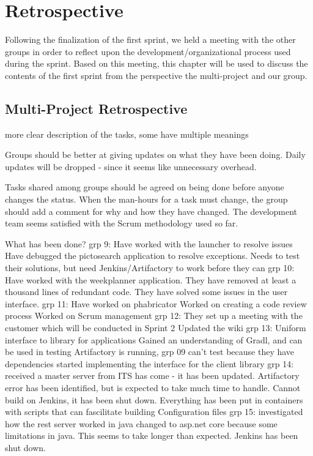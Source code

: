 \section{Retrospective}
Following the finalization of the first sprint, we held a meeting with the other
groups in order to reflect upon the development/organizational process used
during the sprint. Based on this meeting, this chapter will be used to discuss
the contents of the first sprint from the perspective the multi-project and our
group.

\subsection{Multi-Project Retrospective}

more clear description of the tasks, some have multiple meanings

Groups should be better at giving updates on what they have been doing.
Daily updates will be dropped - since it seems like unnecessary overhead.

Tasks shared among groups should be agreed on being done before anyone changes the status.
When the man-hours for a task must change, the group should add a comment for why and how they have changed.
The development team seems satisfied with the Scrum methodology used so far.

What has been done?
grp 9:
Have worked with the launcher to resolve issues
Have debugged the pictosearch application to resolve exceptions.
Needs to test their solutions, but need Jenkins/Artifactory to work before they can
grp 10:
Have worked with the weekplanner application.
They have removed at least a thousand lines of redundant code.
They have solved some issues in the user interface.
grp 11:
Have worked on phabricator
Worked on creating a code review process
Worked on Scrum management
grp 12:
They set up a meeting with the customer which will be conducted in Sprint 2
Updated the wiki
grp 13:
Uniform interface to library for applications
Gained an understanding of Gradl, and can be used in testing
Artifactory is running, grp 09 can’t test because they have dependencies
started implementing the interface for the client library
grp 14:
received a master server from ITS has come - it has been updated.
Artifactory error has been identified, but is expected to take much time to handle.
Cannot build on Jenkins, it has been shut down.
Everything has been put in containers with scripts that can fascilitate building
Configuration files
grp 15:
investigated how the rest server worked in java
changed to asp.net core because some limitations in java. This seems to take longer than expected.
Jenkins has been shut down.

